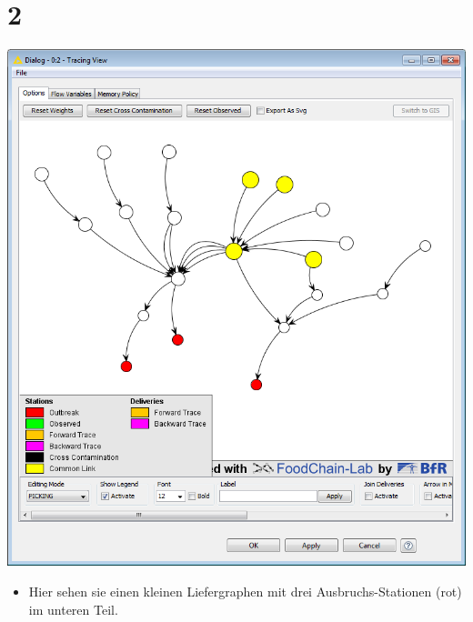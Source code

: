\documentclass{beamer}
\begin{document}
\section{2}
\begin{frame}
	\begin{center}
  		\includegraphics[height=0.6\textheight]{2.png}
	\end{center}
	\begin{itemize}
		\item Hier sehen sie einen kleinen Liefergraphen mit drei Ausbruchs-Stationen (rot) im unteren Teil.
	\end{itemize}
\end{frame}
\end{document}
